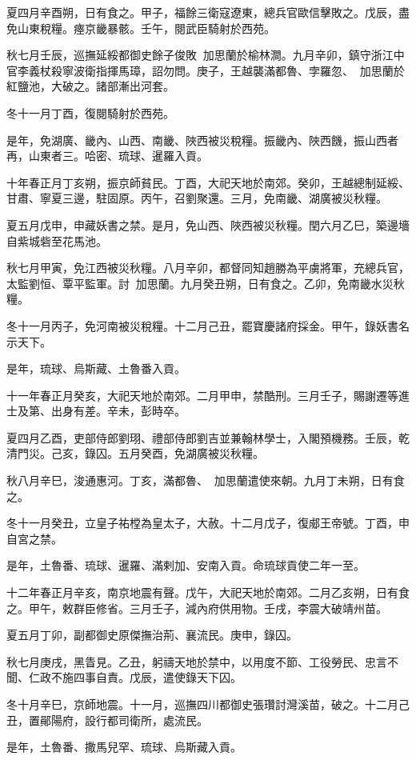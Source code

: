 \begin{pinyinscope}
夏四月辛酉朔，日有食之。甲子，福餘三衛寇遼東，總兵官歐信擊敗之。戊辰，盡免山東稅糧。瘞京畿暴骸。壬午，閱武臣騎射於西苑。

秋七月壬辰，巡撫延綏都御史餘子俊敗加思蘭於榆林澗。九月辛卯，鎮守浙江中官李義杖殺寧波衛指揮馬璋，詔勿問。庚子，王越襲滿都魯、孛羅忽、加思蘭於紅鹽池，大破之。諸部漸出河套。

冬十一月丁酉，復閱騎射於西苑。

是年，免湖廣、畿內、山西、南畿、陜西被災稅糧。振畿內、陜西饑，振山西者再，山東者三。哈密、琉球、暹羅入貢。

十年春正月丁亥朔，振京師貧民。丁酉，大祀天地於南郊。癸卯，王越總制延綏、甘肅、寧夏三邊，駐固原。丙午，召劉聚還。三月，免南畿、湖廣被災秋糧。

夏五月戊申，申藏妖書之禁。是月，免山西、陜西被災秋糧。閏六月乙巳，築邊墻自紫城砦至花馬池。

秋七月甲寅，免江西被災秋糧。八月辛卯，都督同知趙勝為平虜將軍，充總兵官，太監劉恒、覃平監軍。討加思蘭。九月癸丑朔，日有食之。乙卯，免南畿水災秋糧。

冬十一月丙子，免河南被災稅糧。十二月己丑，罷寶慶諸府採金。甲午，錄妖書名示天下。

是年，琉球、烏斯藏、土魯番入貢。

十一年春正月癸亥，大祀天地於南郊。二月甲申，禁酷刑。三月壬子，賜謝遷等進士及第、出身有差。辛未，彭時卒。

夏四月乙酉，吏部侍郎劉珝、禮部侍郎劉吉並兼翰林學士，入閣預機務。壬辰，乾清門災。己亥，錄囚。五月癸酉，免湖廣被災秋糧。

秋八月辛巳，浚通惠河。丁亥，滿都魯、加思蘭遣使來朝。九月丁未朔，日有食之。

冬十一月癸丑，立皇子祐樘為皇太子，大赦。十二月戊子，復郕王帝號。丁酉，申自宮之禁。

是年，土魯番、琉球、暹羅、滿剌加、安南入貢。命琉球貢使二年一至。

十二年春正月辛亥，南京地震有聲。戊午，大祀天地於南郊。二月乙亥朔，日有食之。甲午，敕群臣修省。三月壬子，減內府供用物。壬戌，李震大破靖州苗。

夏五月丁卯，副都御史原傑撫治荊、襄流民。庚申，錄囚。

秋七月庚戌，黑眚見。乙丑，躬禱天地於禁中，以用度不節、工役勞民、忠言不聞、仁政不施四事自責。戊辰，遣使錄天下囚。

冬十月辛巳，京師地震。十一月，巡撫四川都御史張瓚討灣溪苗，破之。十二月己丑，置鄖陽府，設行都司衛所，處流民。

是年，土魯番、撒馬兒罕、琉球、烏斯藏入貢。


\end{pinyinscope}
